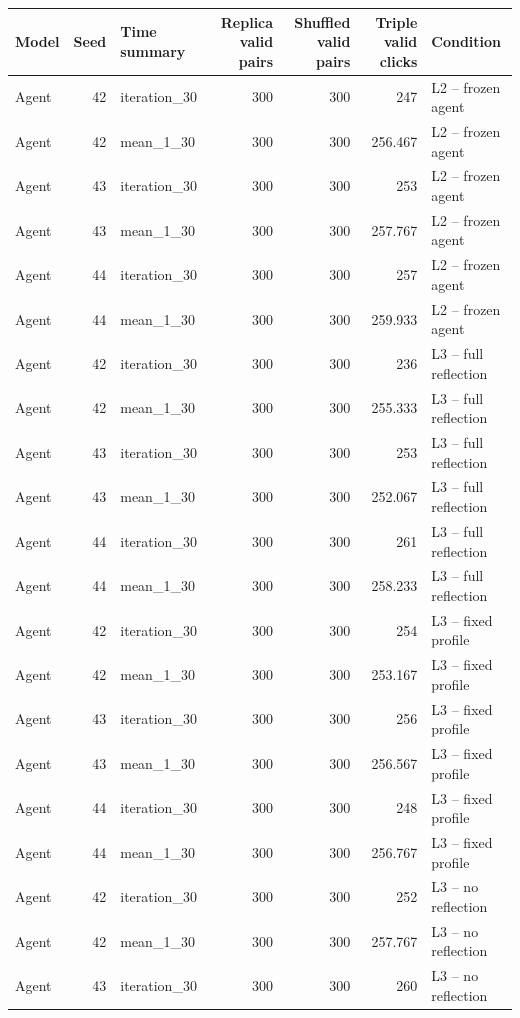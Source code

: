 \begin{table}[htbp!]
\centering
\small
\setlength{\tabcolsep}{3pt}
\renewcommand{\arraystretch}{1.1}
\begin{tabular}{lrlrrrl}
\hline
Model & Seed & Time summary & Replica valid pairs & Shuffled valid pairs & Triple valid clicks & Condition \\
\hline
Agent & 42 & iteration\_30 & 300 & 300 & 247 & L2 -- frozen agent \\
Agent & 42 & mean\_1\_30 & 300 & 300 & 256.467 & L2 -- frozen agent \\
Agent & 43 & iteration\_30 & 300 & 300 & 253 & L2 -- frozen agent \\
Agent & 43 & mean\_1\_30 & 300 & 300 & 257.767 & L2 -- frozen agent \\
Agent & 44 & iteration\_30 & 300 & 300 & 257 & L2 -- frozen agent \\
Agent & 44 & mean\_1\_30 & 300 & 300 & 259.933 & L2 -- frozen agent \\
Agent & 42 & iteration\_30 & 300 & 300 & 236 & L3 -- full reflection \\
Agent & 42 & mean\_1\_30 & 300 & 300 & 255.333 & L3 -- full reflection \\
Agent & 43 & iteration\_30 & 300 & 300 & 253 & L3 -- full reflection \\
Agent & 43 & mean\_1\_30 & 300 & 300 & 252.067 & L3 -- full reflection \\
Agent & 44 & iteration\_30 & 300 & 300 & 261 & L3 -- full reflection \\
Agent & 44 & mean\_1\_30 & 300 & 300 & 258.233 & L3 -- full reflection \\
Agent & 42 & iteration\_30 & 300 & 300 & 254 & L3 -- fixed profile \\
Agent & 42 & mean\_1\_30 & 300 & 300 & 253.167 & L3 -- fixed profile \\
Agent & 43 & iteration\_30 & 300 & 300 & 256 & L3 -- fixed profile \\
Agent & 43 & mean\_1\_30 & 300 & 300 & 256.567 & L3 -- fixed profile \\
Agent & 44 & iteration\_30 & 300 & 300 & 248 & L3 -- fixed profile \\
Agent & 44 & mean\_1\_30 & 300 & 300 & 256.767 & L3 -- fixed profile \\
Agent & 42 & iteration\_30 & 300 & 300 & 252 & L3 -- no reflection \\
Agent & 42 & mean\_1\_30 & 300 & 300 & 257.767 & L3 -- no reflection \\
Agent & 43 & iteration\_30 & 300 & 300 & 260 & L3 -- no reflection \\

\end{tabular}
\end{table}
